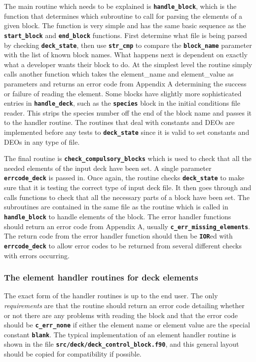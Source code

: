 \documentclass[12pt,a4paper]{article}
\newcommand{\inlinecode}[1]{{\color{warwickred} \bf\texttt{#1}}}
\begin{document}
The main routine which needs to be explained is \inlinecode{handle\_block},
which is the function that determines which subroutine to call for parsing the
elements of a given block. The function is very simple and has the same basic
sequence as the \inlinecode{start\_block} and \inlinecode{end\_block}
functions. First determine what file is being parsed by checking
\inlinecode{deck\_state}, then use \inlinecode{str\_cmp} to compare the
\inlinecode{block\_name} parameter with the list of known block names. What
happens next is dependent on exactly what a developer wants their block to do.
At the simplest level the routine simply calls another function which
takes the element\_name and element\_value as
parameters and returns an error code from Appendix A determining the success or
failure of reading the element. Some blocks have slightly more sophisticated
entries in \inlinecode{handle\_deck}, such as the \inlinecode{species} block in
the initial conditions file reader. This strips the species number off the end
of the block name and passes it to the handler routine. The routines that deal
with constants and DEOs are implemented before any tests to
\inlinecode{deck\_state} since it is valid to set constants and DEOs in any
type of file.

The final routine is \inlinecode{check\_compulsory\_blocks} which is used to
check that all the needed elements of the input deck have been set. A single
parameter \inlinecode{errcode\_deck} is passed in. Once again, the routine
checks \inlinecode{deck\_state} to make sure that it is testing the correct
type of input deck file. It then goes through and calls functions to check that
all the necessary parts of a block have been set. The subroutines are contained
in the same file as the routine which is called in \inlinecode{handle\_block} to
handle elements of the block. The error handler functions should return an
error code from Appendix A, usually \inlinecode{c\_err\_missing\_elements}. The
return code from the error handler function should then be \inlinecode{IOR}ed
with \inlinecode{errcode\_deck} to allow error codes to be returned from
several different checks with errors occurring.

\subsubsection{The element handler routines for deck elements}
The exact form of the handler routines is up to the end user. The only {\it
requirements} are that the routine should return an error code detailing
whether or not there are any problems with reading the block and that the error
code should be \inlinecode{c\_err\_none} if either the element name or element
value are the special constant \inlinecode{blank}. The typical implementation
of an element handler routine is shown in the file
\inlinecode{src/deck/deck\_control\_block.f90}, and this general layout should
be copied for compatibility if possible.\\
\end{document}
